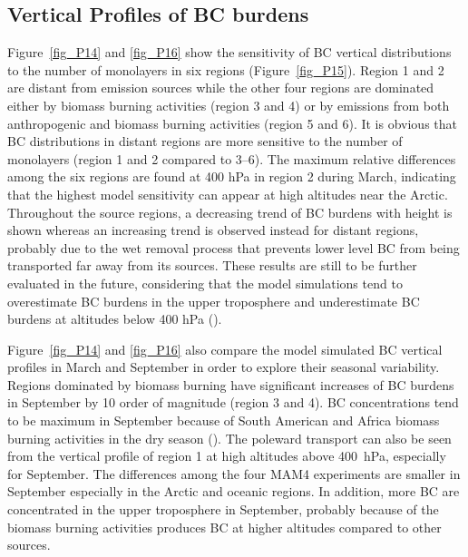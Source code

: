 \documentclass[12pt, fullpage]{uiucthesis2009}
\begin{document}
	\subsection{Vertical Profiles of BC burdens}
	Figure~\ref{fig_P14} and \ref{fig_P16} show the sensitivity of BC vertical distributions to the number of monolayers in six regions (Figure~\ref{fig_P15}). Region 1 and 2 are distant from emission sources while the other four regions are dominated either by biomass burning activities (region 3 and 4) or by emissions from both anthropogenic and biomass burning activities (region 5 and 6). It is obvious that BC distributions in distant regions are more sensitive to the number of monolayers (region 1 and 2 compared to 3--6). The maximum relative differences among the six regions are found at 400 hPa in region 2 during March, indicating that the highest model sensitivity can appear at high altitudes near the Arctic. Throughout the source regions, a decreasing trend of BC burdens with height is shown whereas an increasing trend is observed instead for distant regions, probably due to the wet removal process that prevents lower level BC from being transported far away from its sources. These results are still to be further evaluated in the future, considering that the model simulations tend to overestimate BC burdens in the upper troposphere and underestimate BC burdens at altitudes below 400 hPa (\cite{Liu2016}). 
	
	Figure~\ref{fig_P14} and \ref{fig_P16} also compare the model simulated BC vertical profiles in March and September in order to explore their seasonal variability. Regions dominated by biomass burning have significant increases of BC burdens in September by 10 order of magnitude (region 3 and 4). BC concentrations tend to be maximum in September because of South American and Africa biomass burning activities in the dry season (\cite{Liu2016}). The poleward transport can also be seen from the vertical profile of region 1 at high altitudes above 400~hPa, especially for September. The differences among the four MAM4 experiments are smaller in September especially in the Arctic and oceanic regions. In addition, more BC are concentrated in the upper troposphere in September, probably because of the biomass burning activities produces BC at higher altitudes compared to other sources. 
	
\end{document}
